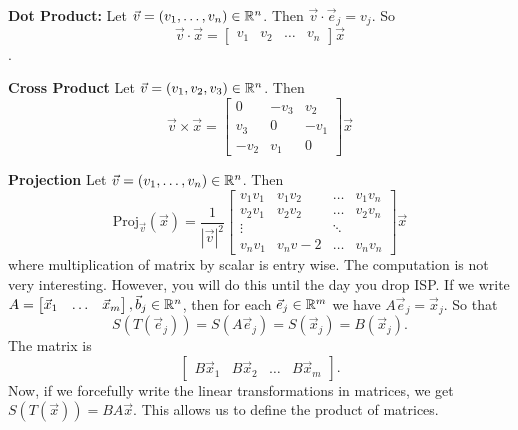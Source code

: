 \textbf{Dot Product: }Let $\vec{v}=(v_1,\ldots,v_n)\in\mathbb{R}^n$. Then $\vec{v}\cdot\vec{e}_j=v_j$. So \[\vec{v}\cdot\vec{x} = \begin{bmatrix}
	v_1 & v_2 &  \ldots & v_n
\end{bmatrix}\vec{x}\].

\textbf{Cross Product} Let $\vec{v}=(v_1,v_2,v_3)\in\mathbb{R}^n$. Then \[
	\vec{v}\times\vec{x} = \begin{bmatrix}
		0 & -v_3 & v_2\\
		v_3 & 0 & -v_1\\
		-v_2 & v_1 & 0
	\end{bmatrix}\vec{x}
\]

\textbf{Projection} Let $\vec{v}=(v_1,\ldots,v_n)\in\mathbb{R}^n$. Then \[
	\textrm{Proj}_{\vec{v}}(\vec{x})=\frac{1}{|\vec{v}|^2}\begin{bmatrix}
		v_1 v_1 & v_1 v_2 & \ldots & v_1 v_n \\
		v_2 v_1 & v_2 v_2 & \ldots & v_2 v_n \\
		\vdots & & \ddots & \\
		v_n v_1 & v_n v-2 & \ldots & v_n v_n
	\end{bmatrix}\vec{x}
\]
where multiplication of matrix by scalar is entry wise.
The computation is not very interesting. However, you will do this until the day you drop ISP.
If we write $A=\begin{bmatrix}
	\vec{x}_1 & \ldots & \vec{x}_m
\end{bmatrix}, \vec{b}_j\in\mathbb{R}^n$, then for each $\vec{e}_j\in\mathbb{R}^m$ we have $A\vec{e}_j=\vec{x}_j$.
So that \[
S(T(\vec{e}_j))= S(A\vec{e}_j) = S(\vec{x}_j) = B(\vec{x}_j).
\]
The matrix is \[
\begin{bmatrix}
	B\vec{x}_1 & B\vec{x}_2 & \ldots & B\vec{x}_m
\end{bmatrix}.
\]
Now, if we forcefully write the linear transformations in matrices, we get $S(T(\vec{x}))= BA\vec{x}$. This allows us
to define the product of matrices.
